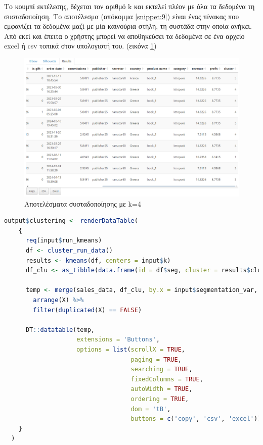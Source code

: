 \documentclass[greek, 12pt]{article}
\begin{document}
Το κουμπί εκτέλεσης, δέχεται τον αριθμό k και εκτελεί πλέον με όλα τα δεδομένα τη συσταδοποίηση. Το αποτέλεσμα (απόκομμα \ref{snippet:9}) είναι ένας πίνακας που εμφανίζει τα δεδομένα μαζί με μία καινούρια στήλη, τη συστάδα στην οποία ανήκει. Από εκεί και έπειτα ο χρήστης μπορεί να αποθηκεύσει τα δεδομένα σε ένα αρχείο excel ή csv τοπικά στον υπολογιστή του. (εικόνα \ref{fig:17})

\begin{figure}[h]
    \centering
    \includegraphics[width=\textwidth]{pictures/17_clustering_results.png}
    \caption{Αποτελέσματα συσταδοποίησης με k=4}
    \label{fig:17}
\end{figure}

\newpage

\begin{lstlisting}[language=R, caption=Κώδικας της συσταδοποίησης, label={snippet:9}]
output$clustering <- renderDataTable(
    {
      req(input$run_kmeans)
      df <- cluster_run_data()
      results <- kmeans(df, centers = input$k)
      df_clu <- as_tibble(data.frame(id = df$seg, cluster = results$cluster))

      temp <- merge(sales_data, df_clu, by.x = input$segmentation_var, by.y = 'id', all.x=T) %>%
        arrange(X) %>%
        filter(duplicated(X) == FALSE)

      DT::datatable(temp,
                    extensions = 'Buttons',
                    options = list(scrollX = TRUE,
                                   paging = TRUE,
                                   searching = TRUE,
                                   fixedColumns = TRUE,
                                   autoWidth = TRUE,
                                   ordering = TRUE,
                                   dom = 'tB',
                                   buttons = c('copy', 'csv', 'excel')))
    }
  )
\end{lstlisting}
\end{document}
